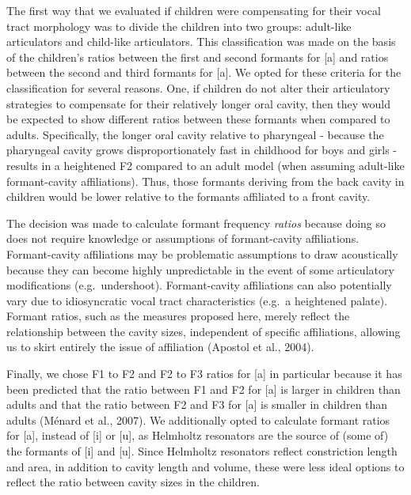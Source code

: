 \documentclass[
]{article}
\begin{document}
The first way that we evaluated if children were compensating for their vocal tract morphology was to divide the children into two groups: adult-like articulators and child-like articulators. This classification was made on the basis of the children's ratios between the first and second formants for {[}a{]} and ratios between the second and third formants for {[}a{]}. We opted for these criteria for the classification for several reasons. One, if children do not alter their articulatory strategies to compensate for their relatively longer oral cavity, then they would be expected to show different ratios between these formants when compared to adults. Specifically, the longer oral cavity relative to pharyngeal - because the pharyngeal cavity grows disproportionately fast in childhood for boys and girls - results in a heightened F2 compared to an adult model (when assuming adult-like formant-cavity affiliations). Thus, those formants deriving from the back cavity in children would be lower relative to the formants affiliated to a front cavity.

The decision was made to calculate formant frequency \emph{ratios} because doing so does not require knowledge or assumptions of formant-cavity affiliations. Formant-cavity affiliations may be problematic assumptions to draw acoustically because they can become highly unpredictable in the event of some articulatory modifications (e.g.~undershoot). Formant-cavity affiliations can also potentially vary due to idiosyncratic vocal tract characteristics (e.g.~a heightened palate). Formant ratios, such as the measures proposed here, merely reflect the relationship between the cavity sizes, independent of specific affiliations, allowing us to skirt entirely the issue of affiliation (Apostol et al., 2004).

Finally, we chose F1 to F2 and F2 to F3 ratios for {[}a{]} in particular because it has been predicted that the ratio between F1 and F2 for {[}a{]} is larger in children than adults and that the ratio between F2 and F3 for {[}a{]} is smaller in children than adults (Ménard et al., 2007). We additionally opted to calculate formant ratios for {[}a{]}, instead of {[}i{]} or {[}u{]}, as Helmholtz resonators are the source of (some of) the formants of {[}i{]} and {[}u{]}. Since Helmholtz resonators reflect constriction length and area, in addition to cavity length and volume, these were less ideal options to reflect the ratio between cavity sizes in the children.
\end{document}
